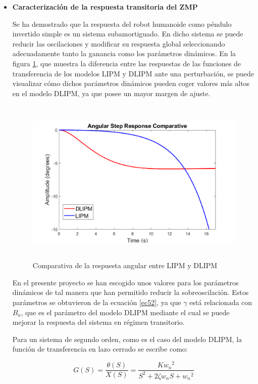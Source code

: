 \begin{itemize}
\item \textbf{Caracterización de la respuesta transitoria del ZMP}

Se ha demostrado que la respuesta del robot humanoide como péndulo invertido simple es un sistema subamortiguado. En dicho sistema se puede reducir las oscilaciones y modificar su respuesta global seleccionando adecuadamente tanto la ganancia como los parámetros dinámicos. En la figura \ref{figura58}, que muestra la diferencia entre las respuestas de las funciones de transferencia de los modelos LIPM y DLIPM ante una perturbación, se puede visualizar cómo dichos parámetros dinámicos pueden coger valores más altos en el modelo DLIPM, ya que posee un mayor margen de ajuste. 

\begin{figure}[H]
\centering
\includegraphics[width=13cm, height=8cm]{imagenes/apartado_5/58_comparativa_paso}
\caption{Comparativa de la respuesta angular entre LIPM y DLIPM}
\label{figura58}
\end{figure}

En el presente proyecto se han escogido unos valores para los parámetros dinámicos de tal manera que han permitido reducir la sobreoscilación. Estos parámetros se obtuvieron de la ecuación \ref{ec52}, ya que $\gamma$ está relacionada con $B_a$, que es el parámetro del modelo DLIPM mediante el cual se puede mejorar la respuesta del sistema en régimen transitorio.

Para un sistema de segundo orden, como es el caso del modelo DLIPM, la función de transferencia en lazo cerrado se escribe como:

\begin{equation}
G(S)=\frac{\theta(S)}{X(S)}=\frac{K{w_{n}}^{2}}{S^{2} + 2\zeta w_{n}S + {w_{n}}^{2}}
\label{ec58}
\end{equation}


\end{itemize}
